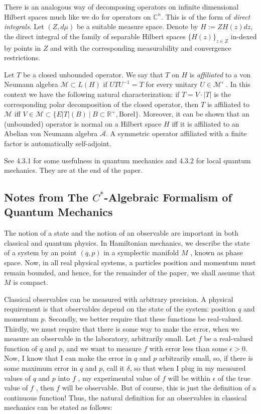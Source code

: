 \documentclass[leqno]{article}
\theoremstyle{definition}
\theoremstyle{remark}
\theoremstyle{theorem}
\newcommand{\R}{\mathbb{R}}
\begin{document}
	There is an analogous way of decomposing operators on infinite dimensional Hilbert spaces much like we do for operators on $\mathbb{C}^n$. This is of the form of \emph{direct integrals}.  Let $(Z, d\mu)$ be a suitable measure space. Denote by $H := Z H(z) dz$, the direct integral of the family of separable Hilbert spaces $\{H(z)\}_{z\in Z}$ in-dexed by points in $Z$ and with the corresponding measurability and convergence restrictions. 
	
	Let $T$ be a closed unbounded operator. We say that $T$ on $H$ is \emph{affiliated} to a von Neumann algebra $\mathcal{M} \subset L(H)$ if $U T U^{-1} = T$ for every unitary $U \in \mathcal{M}'$ . In this context we have the following natural characterization: if $T = V \cdot |T |$ is the corresponding polar decomposition of the closed operator, then $T$ is affiliated to $\mathcal{M}$ iff $V \in \mathcal{M} \subset \{E |T | (B) ~\vert~ B \subset \R^+ , \textrm{Borel} \}$. Moreover, it can be shown that an (unbounded) operator is normal on a Hilbert space $H$ iff it is affiliated to an Abelian von Neumann algebra $\mathcal{A}$.  A symmetric operator affiliated with a finite factor is automatically self-adjoint.
	
	See 4.3.1 for some usefulness in quantum mechanics and 4.3.2 for local quantum mechanics.  They are at the end of the paper.
	
\subsection{Notes from The $C^*$-Algebraic Formalism of Quantum Mechanics}
	 The notion of a state and the notion of an observable are important in both classical and quantum physics. In Hamiltonian mechanics, we describe the state of a system by an point $(q, p)$ in a symplectic manifold $M$ , known as phase space. Now, in all real physical
systems, a particles position and momentum must remain bounded, and hence, for the remainder of the paper, we shall assume that $M$ is compact.

	Classical observables can be measured with arbitrary precision.  A physical requirement is that observables depend on the state of the system: position $q$ and momentum $p$. Secondly, we better require that these functions be real-valued.
Thirdly, we must require that there is some way to make the error, when we measure an observable in the laboratory, arbitrarily small. Let $f$ be a real-valued function of $q$ and $p$, and we want to measure $f$ with error less
than some $\epsilon > 0$. Now, I know that I can make the error in $q$ and $p$ arbitrarily small, so, if there is some maximum error in $q$ and $p$, call it $\delta$, so that when I plug in my measured values of $q$ and $p$ into $f$ , my experimental value of $f$ will be within $\epsilon$ of the true value of $f$ , then $f$ will be observable. But of course, this is just the definition of a continuous function! Thus, the natural definition for an observables in classical mechanics can be stated as follows:
\end{document}
